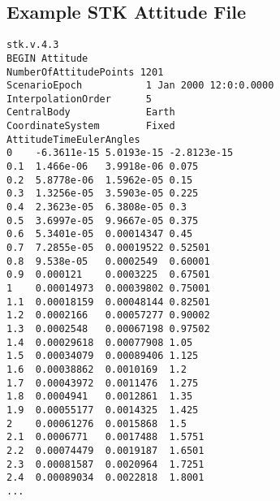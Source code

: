 \subsection{Example STK Attitude File}\label{app:afile}
\begin{verbatim}
stk.v.4.3
BEGIN Attitude
NumberOfAttitudePoints 1201
ScenarioEpoch           1 Jan 2000 12:0:0.0000
InterpolationOrder      5
CentralBody             Earth
CoordinateSystem        Fixed
AttitudeTimeEulerAngles
0    -6.3611e-15 5.0193e-15 -2.8123e-15
0.1  1.466e-06   3.9918e-06 0.075
0.2  5.8778e-06  1.5962e-05 0.15
0.3  1.3256e-05  3.5903e-05 0.225
0.4  2.3623e-05  6.3808e-05 0.3
0.5  3.6997e-05  9.9667e-05 0.375
0.6  5.3401e-05  0.00014347 0.45
0.7  7.2855e-05  0.00019522 0.52501
0.8  9.538e-05   0.0002549  0.60001
0.9  0.000121    0.0003225  0.67501
1    0.00014973  0.00039802 0.75001
1.1  0.00018159  0.00048144 0.82501
1.2  0.0002166   0.00057277 0.90002
1.3  0.0002548   0.00067198 0.97502
1.4  0.00029618  0.00077908 1.05
1.5  0.00034079  0.00089406 1.125
1.6  0.00038862  0.0010169  1.2
1.7  0.00043972  0.0011476  1.275
1.8  0.0004941   0.0012861  1.35
1.9  0.00055177  0.0014325  1.425
2    0.00061276  0.0015868  1.5
2.1  0.0006771   0.0017488  1.5751
2.2  0.00074479  0.0019187  1.6501
2.3  0.00081587  0.0020964  1.7251
2.4  0.00089034  0.0022818  1.8001
...
\end{verbatim}